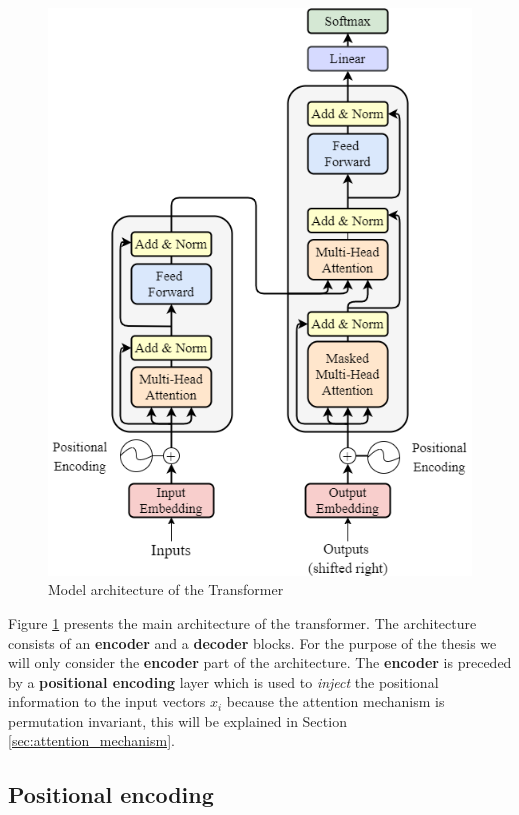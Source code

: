 \documentclass[a4paper, twoside]{report}
\theoremstyle{definition}
\numberwithin{equation}{section}
\begin{document}
\begin{figure}[h]
    \centering
    \includegraphics[scale=0.5]{attention_is_all_you_need.png}
    \caption{Model architecture of the Transformer \cite{1706.03762}}
    \label{fig:attention_is_all_you_need}
\end{figure}

Figure \ref{fig:attention_is_all_you_need} presents the main architecture of the transformer.
The architecture consists of an \textbf{encoder} and a \textbf{decoder} blocks.
For the purpose of the thesis we will only consider the \textbf{encoder} part of the architecture.
The \textbf{encoder} is preceded by a \textbf{positional encoding} layer which is used to \emph{inject} the positional information
to the input vectors $x_i$ because the attention mechanism is permutation invariant,
this will be explained in Section \ref{sec:attention_mechanism}.

\subsection{Positional encoding}
\end{document}
